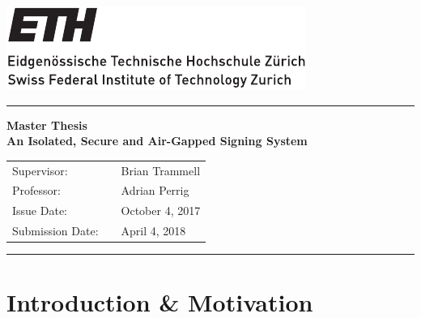 \documentclass[a4paper, 11pt]{article}
\begin{document}
\includegraphics[scale=1]{../images/ETHlogo_13.pdf}
\vspace{10pt}
\hrule
\vspace{10pt}

\begin{center}
    {\LARGE
    \textbf{Master Thesis}\\
    \vspace{5pt}
    \textbf{\Huge{An Isolated, Secure and Air-Gapped Signing System}}}
 
    \vspace{15pt}
    \begin{tabular}{lll}
    Supervisor: & & Brian Trammell \\
    Professor: & & Adrian Perrig \\
    Issue Date: & & October 4, 2017 \\
    Submission Date: & & April 4, 2018
    \end{tabular}

   
\end{center}

\vspace{10pt}
\hrule

\section{Introduction \& Motivation}
\end{document}
